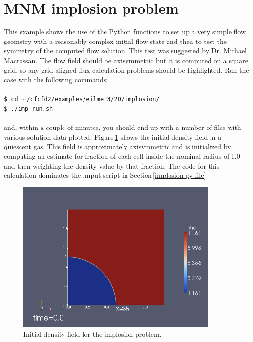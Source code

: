 
\section{MNM implosion problem}
\label{mnm-implosion-sec}
%
This example shows the use of the Python functions to set up
a very simple flow geometry with a reasonably complex initial flow state 
and then to test the symmetry of the computed flow solution.
This test was suggested by Dr. Michael Macrossan.
The flow field should be axisymmetric but it is computed on a square grid,
so any grid-aligned flux calculation problems should be highlighted.
Run the case with the following commands:\\
%
\topbar\\
\texttt{\$ cd $\sim$/cfcfd2/examples/eilmer3/2D/implosion/}\\
\texttt{\$ ./imp\_run.sh}\\
\bottombar\\
%
and, within a couple of minutes, you should end up with a number of files
with various solution data plotted.
Figure\,\ref{implosion-initial-density-fig} shows the initial density field
in a quiescent gas.
This field is approximately axisymmetric and is initialized by computing an estimate
for fraction of each cell inside the nominal radius of 1.0 and then weighting the
density value by that fraction.
The code for this calculation dominates the imput script in Section\,\ref{implosion-py-file}

\begin{figure}[htbp]
\begin{center}
\includegraphics[width=10cm]{../2D/implosion/density-t0000.png}
\end{center}
\caption{Initial density field for the implosion problem.}
\label{implosion-initial-density-fig}
\end{figure}

